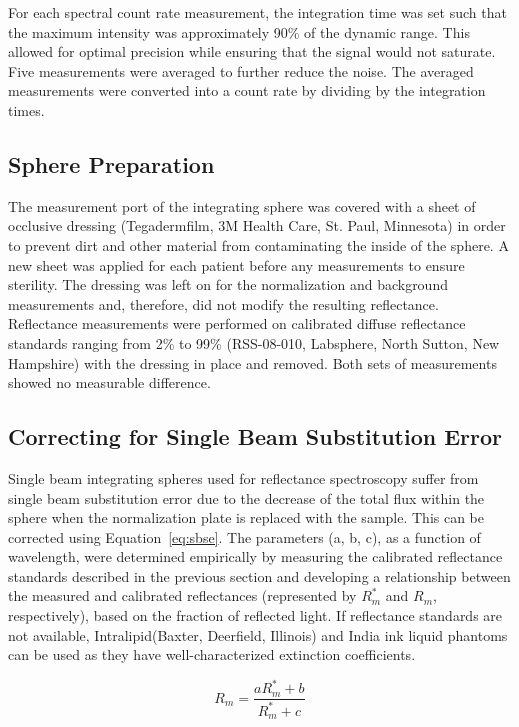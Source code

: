 For each spectral count rate measurement, the integration time was set such that the maximum intensity was approximately 90\% of the dynamic range. This allowed for optimal precision while ensuring that the signal would not saturate. Five measurements were averaged to further reduce the noise. The averaged measurements were converted into a count rate by dividing by the integration times.

\subsection{Sphere Preparation}
The measurement port of the integrating sphere was covered with a sheet of occlusive dressing (Tegaderm\texttrademark film, 3M Health Care, St. Paul, Minnesota) in order to prevent dirt and other material from contaminating the inside of the sphere. A new sheet was applied for each patient before any measurements to ensure sterility. The dressing was left on for the normalization and background measurements and, therefore, did not modify the resulting reflectance. Reflectance measurements were performed on calibrated diffuse reflectance standards ranging from 2\% to 99\% (RSS-08-010, Labsphere, North Sutton, New Hampshire) with the dressing in place and removed. Both sets of measurements showed no measurable difference.

\subsection{Correcting for Single Beam Substitution Error}
Single beam integrating spheres used for reflectance spectroscopy suffer from single beam substitution error\cite{Springsteen1998,Labspherec} due to the decrease of the total flux within the sphere when the normalization plate is replaced with the sample. This can be corrected using Equation~\ref{eq:sbse}. The parameters (a, b, c), as a function of wavelength, were determined empirically by measuring the calibrated reflectance standards described in the previous section and developing a relationship between the measured and calibrated reflectances (represented by $R_m^\ast$ and $R_m$, respectively), based on the fraction of reflected light. If reflectance standards are not available, Intralipid\texttrademark (Baxter, Deerfield, Illinois) and India ink liquid phantoms can be used as they have well-characterized extinction coefficients.\cite{Flock1992,Madsen1992}

\begin{equation}
\label{eq:sbse}
	R_m = \frac{aR_m^\ast + b}{R_m^\ast + c}
\end{equation}

